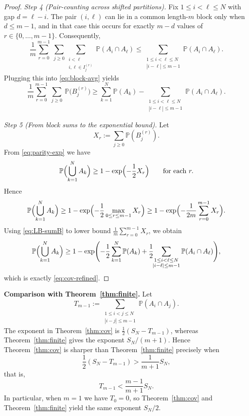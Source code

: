 \documentclass[11pt]{article}
\begin{document}
\begin{proof}
\medskip
\textit{Step 4 (Pair-counting across shifted partitions).}
Fix $1\le i<\ell\le N$ with gap $d=\ell-i$.  The pair $(i,\ell)$ can lie in
a common length-$m$ block only when $d\le m-1$, and in that case this occurs
for exactly $m-d$ values of $r\in\{0,\dots,m-1\}$.  Consequently,
\[
  \frac{1}{m}\sum_{r=0}^{m-1}\ \sum_{j\ge0}
  \sum_{\substack{i<\ell\\ i,\ell\in I^{(r)}_{j}}} \mathbb{P}(A_i\cap A_\ell)
  \le
  \sum_{\substack{1\le i<\ell\le N\\ |i-\ell|\le m-1}} \mathbb{P}(A_i\cap A_\ell).
\]
Plugging this into \eqref{eq:block-avg} yields
\begin{equation}\label{eq:LB-sumB}
  \frac{1}{m}\sum_{r=0}^{m-1}\ \sum_{j\ge0}\ \mathbb{P}\bigl(B^{(r)}_{j}\bigr)
  \ge
  \sum_{k=1}^N \mathbb{P}(A_k)
  -
  \sum_{\substack{1\le i<\ell\le N\\ |i-\ell|\le m-1}} \mathbb{P}(A_i\cap A_\ell).
\end{equation}

\medskip
\textit{Step 5 (From block sums to the exponential bound).}
Let
\[
  X_r:=\sum_{j\ge0}\mathbb{P}(B^{(r)}_{j}).
\]
From \eqref{eq:parity-exp} we have
\[
  \mathbb{P}\Bigl(\bigcup_{k=1}^N A_k\Bigr)
  \ge 1-\exp\Bigl(-\frac{1}{2}X_r\Bigr)
  \qquad\text{for each }r.
\]
Hence
\[
  \mathbb{P}\Bigl(\bigcup_{k=1}^N A_k\Bigr)
  \ge 1-\exp\Bigl(-\frac{1}{2}\max_{0\le r\le m-1} X_r\Bigr)
  \ge 1-\exp\Bigl(-\frac{1}{2m}\sum_{r=0}^{m-1} X_r\Bigr).
\]
Using \eqref{eq:LB-sumB} to lower bound
\(\frac{1}{m}\sum_{r=0}^{m-1} X_r\), we obtain
\[
  \mathbb{P}\Bigl(\bigcup_{k=1}^N A_k\Bigr)
  \ge
  1-\exp\Biggl(
   -\frac{1}{2}\sum_{k=1}^N \mathbb{P}(A_k)
   +\frac{1}{2}\!\!\sum_{\substack{1\le i<\ell\le N\\|i-\ell|\le m-1}}
   \mathbb{P}(A_i\cap A_\ell)
  \Biggr),
\]
which is exactly \eqref{eq:cov-refined}.
\end{proof}

\medskip
\noindent\textbf{Comparison with Theorem~\ref{thm:finite}.}
Let
\[
  T_{m-1}:=\sum_{\substack{1\le i<j\le N\\|i-j|\le m-1}}
  \mathbb{P}(A_i\cap A_j).
\]
The exponent in Theorem~\ref{thm:cov} is \(\frac12(S_N-T_{m-1})\),
whereas Theorem~\ref{thm:finite} gives the exponent \(S_N/(m+1)\).
Hence Theorem~\ref{thm:cov} is sharper than Theorem~\ref{thm:finite}
precisely when
\[
  \frac{1}{2}(S_N-T_{m-1})>\frac{1}{m+1}S_N,
\]
that is,
\[
  T_{m-1}<\frac{m-1}{m+1}S_N.
\]
In particular, when \(m=1\) we have \(T_0=0\), so
Theorem~\ref{thm:cov} and Theorem~\ref{thm:finite} yield the same
exponent \(S_N/2\).
\end{document}
